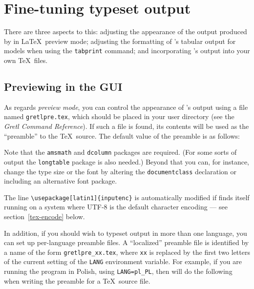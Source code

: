 \section{Fine-tuning typeset output}
\label{tex-tune}

There are three aspects to this: adjusting the appearance of the
output produced by  in \LaTeX\ preview mode; adjusting the
formatting of 's tabular output for models when using the
\texttt{tabprint} command; and incorporating 's output into
your own \TeX\ files.


\subsection{Previewing in the GUI}

As regards \emph{preview mode}, you can control the appearance of
's output using a file named \verb+gretlpre.tex+, which
should be placed in your  user directory (see the
\emph{Gretl Command Reference}).  If such a file is found, its
contents will be used as the ``preamble'' to the \TeX\ source.  The
default value of the preamble is as follows:
    

Note that the \verb+amsmath+ and \verb+dcolumn+ packages are required.
(For some sorts of output the \verb+longtable+ package is also
needed.)  Beyond that you can, for instance, change the type size or
the font by altering the \texttt{documentclass} declaration or
including an alternative font package.

The line \verb|\usepackage[latin1]{inputenc}| is automatically
modified if  finds itself running on a system where UTF-8
is the default character encoding --- see section~\ref{tex-encode}
below.

In addition, if you should wish to typeset  output in more
than one language, you can set up per-language preamble files.  A
``localized'' preamble file is identified by a name of the form
\verb|gretlpre_xx.tex|, where \texttt{xx} is replaced by the first two
letters of the current setting of the \texttt{LANG} environment
variable.  For example, if you are running the program in Polish,
using \verb|LANG=pl_PL|, then  will do the following when
writing the preamble for a \TeX\ source file.

